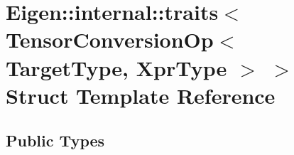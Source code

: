 \hypertarget{struct_eigen_1_1internal_1_1traits_3_01_tensor_conversion_op_3_01_target_type_00_01_xpr_type_01_4_01_4}{}\section{Eigen\+:\+:internal\+:\+:traits$<$ Tensor\+Conversion\+Op$<$ Target\+Type, Xpr\+Type $>$ $>$ Struct Template Reference}
\label{struct_eigen_1_1internal_1_1traits_3_01_tensor_conversion_op_3_01_target_type_00_01_xpr_type_01_4_01_4}
\subsection*{Public Types}
